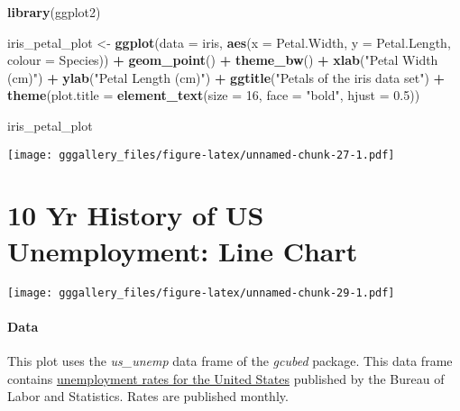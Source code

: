 \documentclass[]{book}
\newenvironment{Shaded}{\begin{snugshade}}{\end{snugshade}}
\newcommand{\DataTypeTok}[1]{\textcolor[rgb]{0.13,0.29,0.53}{#1}}
\newcommand{\DecValTok}[1]{\textcolor[rgb]{0.00,0.00,0.81}{#1}}
\newcommand{\FloatTok}[1]{\textcolor[rgb]{0.00,0.00,0.81}{#1}}
\newcommand{\KeywordTok}[1]{\textcolor[rgb]{0.13,0.29,0.53}{\textbf{#1}}}
\newcommand{\NormalTok}[1]{#1}
\newcommand{\OperatorTok}[1]{\textcolor[rgb]{0.81,0.36,0.00}{\textbf{#1}}}
\newcommand{\StringTok}[1]{\textcolor[rgb]{0.31,0.60,0.02}{#1}}
\begin{document}
\begin{Shaded}
\begin{Highlighting}[]
\KeywordTok{library}\NormalTok{(ggplot2)}

\NormalTok{iris_petal_plot <-}\StringTok{ }\KeywordTok{ggplot}\NormalTok{(}\DataTypeTok{data =}\NormalTok{ iris, }\KeywordTok{aes}\NormalTok{(}\DataTypeTok{x =}\NormalTok{ Petal.Width, }\DataTypeTok{y =}\NormalTok{ Petal.Length, }\DataTypeTok{colour =}\NormalTok{ Species)) }\OperatorTok{+}\StringTok{ }
\StringTok{  }\KeywordTok{geom_point}\NormalTok{() }\OperatorTok{+}\StringTok{ }\KeywordTok{theme_bw}\NormalTok{() }\OperatorTok{+}
\StringTok{  }\KeywordTok{xlab}\NormalTok{(}\StringTok{"Petal Width (cm)"}\NormalTok{) }\OperatorTok{+}\StringTok{ }
\StringTok{  }\KeywordTok{ylab}\NormalTok{(}\StringTok{"Petal Length (cm)"}\NormalTok{) }\OperatorTok{+}\StringTok{ }
\StringTok{  }\KeywordTok{ggtitle}\NormalTok{(}\StringTok{"Petals of the iris data set"}\NormalTok{) }\OperatorTok{+}\StringTok{ }
\StringTok{  }\KeywordTok{theme}\NormalTok{(}\DataTypeTok{plot.title =} \KeywordTok{element_text}\NormalTok{(}\DataTypeTok{size =} \DecValTok{16}\NormalTok{, }\DataTypeTok{face =} \StringTok{"bold"}\NormalTok{, }\DataTypeTok{hjust =} \FloatTok{0.5}\NormalTok{))}

\NormalTok{iris_petal_plot}
\end{Highlighting}
\end{Shaded}

\texttt{[image: gggallery\_files/figure-latex/unnamed-chunk-27-1.pdf]}

\hypertarget{unemp}{%
\chapter*{10 Yr History of US Unemployment: Line Chart}\label{unemp}}

\texttt{[image: gggallery\_files/figure-latex/unnamed-chunk-29-1.pdf]}

\hypertarget{unempdata}{%
\subsubsection*{Data}\label{unempdata}}

This plot uses the \emph{us\_unemp} data frame of the \emph{gcubed} package. This data frame contains \href{https://data.bls.gov/timeseries/LNS14000000}{unemployment rates for the United States} published by the Bureau of Labor and Statistics. Rates are published monthly.
\end{document}
